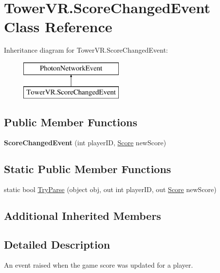 \hypertarget{class_tower_v_r_1_1_score_changed_event}{}\section{Tower\+V\+R.\+Score\+Changed\+Event Class Reference}
\label{class_tower_v_r_1_1_score_changed_event}
Inheritance diagram for Tower\+V\+R.\+Score\+Changed\+Event\+:\begin{figure}[H]
\begin{center}
\leavevmode
\includegraphics[height=2.000000cm]{class_tower_v_r_1_1_score_changed_event}
\end{center}
\end{figure}
\subsection*{Public Member Functions}
\begin{DoxyCompactItemize}
\item 
{\bfseries Score\+Changed\+Event} (int player\+ID, \hyperlink{struct_tower_v_r_1_1_score}{Score} new\+Score)\hypertarget{class_tower_v_r_1_1_score_changed_event_aff763c9b3f5d45ebf05a94e2f5d5abdb}{}\label{class_tower_v_r_1_1_score_changed_event_aff763c9b3f5d45ebf05a94e2f5d5abdb}

\end{DoxyCompactItemize}
\subsection*{Static Public Member Functions}
\begin{DoxyCompactItemize}
\item 
static bool \hyperlink{class_tower_v_r_1_1_score_changed_event_af3691bfe6c230ac7218d6d0723aedc49}{Try\+Parse} (object obj, out int player\+ID, out \hyperlink{struct_tower_v_r_1_1_score}{Score} new\+Score)
\end{DoxyCompactItemize}
\subsection*{Additional Inherited Members}


\subsection{Detailed Description}
An event raised when the game score was updated for a player. 

